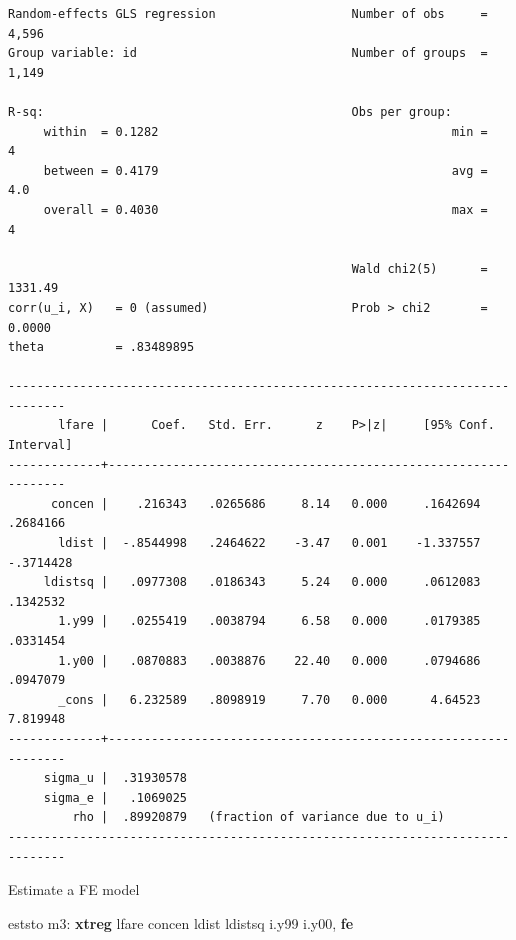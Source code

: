 \documentclass[
]{book}
\newenvironment{Shaded}{\begin{snugshade}}{\end{snugshade}}
\newcommand{\KeywordTok}[1]{\textcolor[rgb]{0.13,0.29,0.53}{\textbf{#1}}}
\newcommand{\NormalTok}[1]{#1}
\begin{document}
\begin{verbatim}
Random-effects GLS regression                   Number of obs     =      4,596
Group variable: id                              Number of groups  =      1,149

R-sq:                                           Obs per group:
     within  = 0.1282                                         min =          4
     between = 0.4179                                         avg =        4.0
     overall = 0.4030                                         max =          4

                                                Wald chi2(5)      =    1331.49
corr(u_i, X)   = 0 (assumed)                    Prob > chi2       =     0.0000
theta          = .83489895

------------------------------------------------------------------------------
       lfare |      Coef.   Std. Err.      z    P>|z|     [95% Conf. Interval]
-------------+----------------------------------------------------------------
      concen |    .216343   .0265686     8.14   0.000     .1642694    .2684166
       ldist |  -.8544998   .2464622    -3.47   0.001    -1.337557   -.3714428
     ldistsq |   .0977308   .0186343     5.24   0.000     .0612083    .1342532
       1.y99 |   .0255419   .0038794     6.58   0.000     .0179385    .0331454
       1.y00 |   .0870883   .0038876    22.40   0.000     .0794686    .0947079
       _cons |   6.232589   .8098919     7.70   0.000      4.64523    7.819948
-------------+----------------------------------------------------------------
     sigma_u |  .31930578
     sigma_e |   .1069025
         rho |  .89920879   (fraction of variance due to u_i)
------------------------------------------------------------------------------
\end{verbatim}

Estimate a FE model

\begin{Shaded}
\begin{Highlighting}[]
\NormalTok{eststo m3: }\KeywordTok{xtreg}\NormalTok{ lfare concen ldist ldistsq i.y99 i.y00, }\KeywordTok{fe}
\end{Highlighting}
\end{Shaded}
\end{document}
